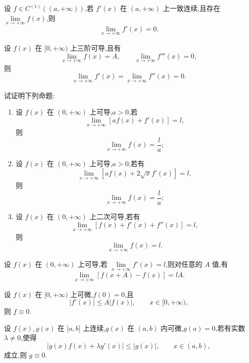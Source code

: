 \documentclass[../../数学分析培优讲义.tex]{subfiles}
\begin{document}
\begin{example}[\markstar]
设 $f\in C^{(1)}((a,+\infty))$,若 $f'(x)$ 在 $(a,+\infty)$ 上一致连续,且存在 $\displaystyle\lim\limits_{x\to+\infty}f(x)$,则
\[
    \lim\limits_{x\to+\infty}f'(x)=0.
\]
\end{example}
\exampleblank

\begin{example}[\markstar]
设 $f(x)$ 在 $\lbrack 0,+\infty)$ 上三阶可导,且有
\[
    \lim\limits_{x\to+\infty}f(x)=A,
    \qquad
    \lim\limits_{x\to+\infty}f'''(x)=0,
\]
则
\[
    \lim\limits_{x\to+\infty}f'(x)
    =\lim\limits_{x\to+\infty}f''(x)=0.
\]
\end{example}
\exampleblank

\begin{example}[\markstar]
试证明下列命题:
\begin{enumerate}[label=(\arabic*)]
    \item 设 $f(x)$ 在 $(0,+\infty)$ 上可导,$a>0$,若
    \[
        \lim\limits_{x\to+\infty}[af(x)+f'(x)]=l,
    \]
    则
    \[
        \lim\limits_{x\to+\infty}f(x)=\dfrac{l}{a};
    \]
    \item 设 $f(x)$ 在 $(0,+\infty)$ 上可导,$a>0$,若有
    \[
        \lim\limits_{x\to+\infty}[af(x)+2\sqrt{x}f'(x)]=l,
    \]
    则
    \[
        \lim\limits_{x\to+\infty}f(x)=\dfrac{l}{a};
    \]
    \item 设 $f(x)$ 在 $(0,+\infty)$ 上二次可导,若有
    \[
        \lim\limits_{x\to+\infty}[f(x)+f'(x)+f''(x)]=l,
    \]
    则
    \[
        \lim\limits_{x\to+\infty}f(x)=l.
    \]
\end{enumerate}
\end{example}
\exampleblank

\begin{example}
设 $f(x)$ 在 $(0,+\infty)$ 上可导,若 $\displaystyle\lim\limits_{x\to+\infty}f'(x)=l$,则对任意的 $A$ 值,有
\[
    \lim\limits_{x\to+\infty}[f(x+A)-f(x)]=lA.
\]
\end{example}
\exampleblank

\begin{example}[\markstar]
设 $f(x)$ 在 $\lbrack 0,+\infty)$ 上可微,$f(0)=0$,且
\[
    |f'(x)|\leq A|f(x)|,
    \qquad x\in\lbrack 0,+\infty),
\]
则 $f\equiv0$.
\end{example}
\exampleblank

\begin{example}
设 $f(x),g(x)$ 在 $\lbrack a,b\rbrack$ 上连续,$g(x)$ 在 $(a,b)$ 内可微,$g(a)=0$,若有实数 $\lambda\neq0$,使得
\[
    |g(x)f(x)+\lambda g'(x)|\leq|g(x)|,
    \qquad x\in(a,b),
\]
成立,则 $g\equiv0$.
\end{example}
\exampleblank
\end{document}
